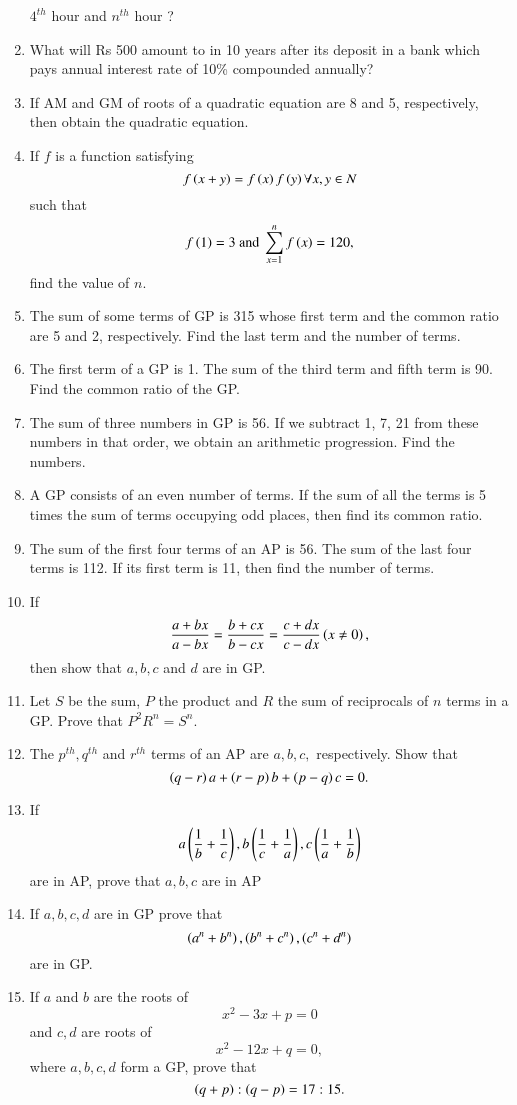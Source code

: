 \begin{enumerate}[label=\thesubsection.\arabic*.,ref=\thesubsection.\theenumi]
$4^{th}$ hour and $n^{th}$ hour ?
\item What will Rs 500 amount to in 10 years after its deposit in a bank which pays annual interest rate of 10\% compounded annually?
\item If AM  and GM  of roots of a quadratic equation are 8 and 5, respectively, then obtain the quadratic equation.
\item If $f$ is a function satisfying $$f\left(x +y\right) = f\left(x\right) f\left(y\right) \forall x,y \in N$$ such that 
	$$f\left(1\right) = 3\text{ and }\sum_{x = 1}^n f\left(x\right) = 120,$$ find the value of $n$.
\item The sum of some terms of GP  is 315 whose first term and the common ratio are 5 and 2, respectively. Find the last term and the number of terms.
\item  The first term of a GP  is 1. The sum of the third term and fifth term is 90. Find the common ratio of the GP.
\item The sum of three numbers in GP  is 56. If we subtract 1, 7, 21 from these numbers in that order, we obtain an arithmetic progression. Find the numbers.
\item A GP  consists of an even number of terms. If the sum of all the terms is 5 times the sum of terms occupying odd places, then find its common ratio.
\item  The sum of the first four terms of an AP  is 56. The sum of the last four terms is 112. If its first term is 11, then find the number of terms.
\item If $$\frac{a+bx}{a-bx} = \frac{b+cx}{b-cx} = \frac{c+dx}{c-dx}\left(x \neq 0\right),$$ then show that $a, b, c$ and $d$ are in GP.
\item Let $S$ be the sum, $P$ the product and $R$ the sum of reciprocals of $n$ terms in a GP.  Prove that $P^2R^n = S^n.$ 
\item The $p^{th}, q^{th}$ and $r^{th}$ terms of an AP  are $a, b, c,$ respectively. Show that 
$$\left(q - r \right)a + \left(r - p \right)b + \left(p - q \right)c = 0.$$
\item If $$a\left(\frac{1}{b}+\frac{1}{c}\right), b\left(\frac{1}{c}+\frac{1}{a}\right), c\left(\frac{1}{a}+\frac{1}{b}\right)$$ are in AP, prove that $a, b, c$ are in AP 
\item If $a, b, c, d$ are in GP  prove that $$\left(a^n + b^n\right), \left(b^n + c^n\right), \left(c^n + d^n\right)$$ are in GP. 
\item If $a$ and $b$ are the roots of $$x^2 - 3x + p = 0$$ and $c, d$ are roots of $$x^2 - 12x + q = 0,$$ where $a, b, c, d$ form a GP,  prove that $$\left(q + p\right) : \left(q - p\right) = 17:15.$$

\end{enumerate}
